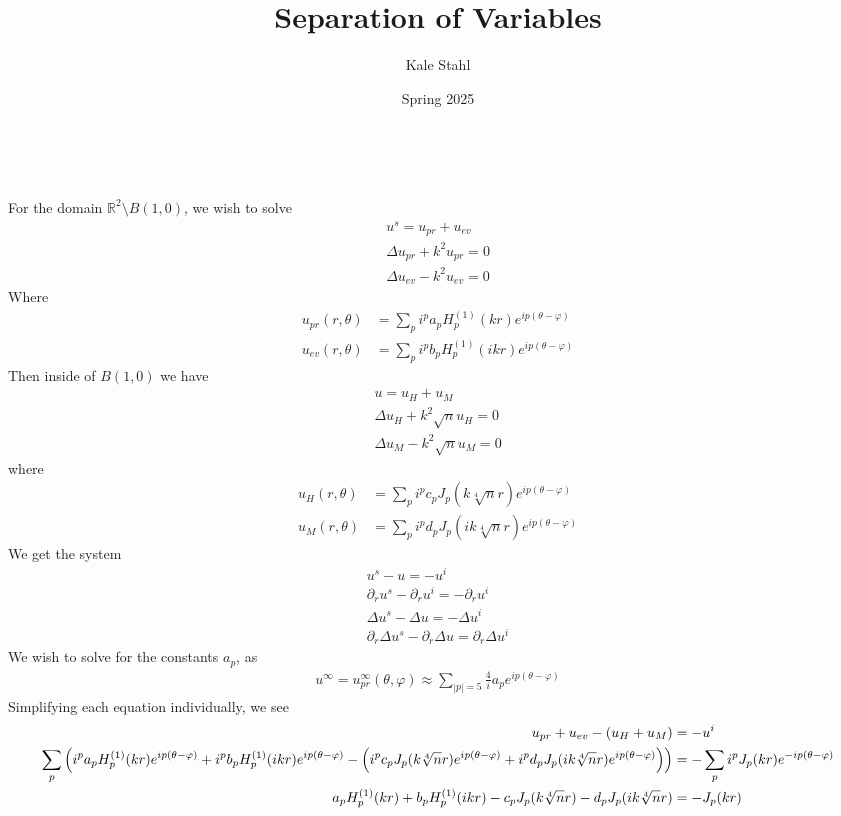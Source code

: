 \documentclass[]{article}
\title{Separation of Variables}
\date{Spring 2025}
\author{Kale Stahl}
\numberwithin{theorem}{section}
\numberwithin{definition}{section}
\numberwithin{proposition}{section}
\numberwithin{lemma}{section}
\numberwithin{equation}{section}
\newcommand{\bd}{\textbf}
\newcommand{\R}{\mathbb R}
\renewcommand{\phi}{\varphi}
\begin{document}
	
	\makeatletter
	\begin{center}
		\vspace{.25cm}
		{\centering \Large \bd \@title}\\
		\vspace{.5cm}
		{\large \@author}
		\vspace{.75cm}
	\end{center}
	\makeatother
	For the domain $\R^2\setminus B(1, 0)$, we wish to solve
	\begin{align}
		u^s = u_{pr} + u_{ev}\\
		\Delta u_{pr}+ k^2u_{pr} = 0\\
		\Delta u_{ev} - k^2 u_{ev} = 0
	\end{align}
	Where
	\begin{align}
		u_{pr}(r, \theta) &= \sum_p i^pa_pH^{(1)}_p(kr)e^{ip(\theta - \phi)}\\
		u_{ev}(r, \theta) &= \sum_p i^pb_pH^{(1)}_p(ikr)e^{ip(\theta - \phi)}
	\end{align}
	Then inside of $B(1, 0)$ we have 
	\begin{align}
		u = u_H + u_M\\
		\Delta u_{H}+ k^2\sqrt n u_{H} = 0\\
		\Delta u_{M} - k^2\sqrt n u_{M} = 0
	\end{align}
	where
	\begin{align}
		u_{H}(r, \theta) &= \sum_p i^pc_pJ_p(k\sqrt[4]{n}r)e^{ip(\theta - \phi)}\\
		u_{M}(r, \theta) &= \sum_p i^pd_pJ_p(ik\sqrt[4]{n}r)e^{ip(\theta - \phi)}
	\end{align}
	We get the system
	\begin{align}
		u^s - u = -u^i\\
		\partial_ru^s- \partial_r u^i = - \partial_r u^i\\
		\Delta u^s - \Delta u = - \Delta u^i\\
		\partial_r\Delta u^s - \partial_r \Delta u = \partial_r\Delta u^i
	\end{align}
	We wish to solve for the constants $a_p$, as 
	\begin{align}
		u^\infty = u^\infty_{pr}(\theta, \phi) \approx \sum_{|p| = 5}\frac{4}{i}a_pe^{ip(\theta -\phi)}
	\end{align}
	Simplifying each equation individually, we see
	\begin{align}
		u_{pr}+u_{ev} -(u_H + u_M) &= -u^i\\
		\sum_p \paren{i^pa_pH^{(1)}_p(kr)e^{ip(\theta-\phi)}+i^pb_pH^{(1)}_p(ikr)e^{ip(\theta - \phi)}-\paren{i^pc_pJ_p(k\sqrt[4]{n}r)e^{ip(\theta-\phi)}+i^pd_pJ_p(ik\sqrt[4]{n}r)e^{ip(\theta - \phi)}}} &= -\sum_pi^pJ_p(kr)e^{-ip(\theta - \phi)}\\
		a_pH^{(1)}_p(kr)+b_pH^{(1)}_p(ikr)-c_pJ_p(k\sqrt[4]{n}r)-d_pJ_p(ik\sqrt[4]{n}r) &= -J_p(kr)
	\end{align}
\end{document}
